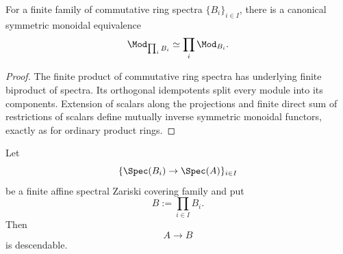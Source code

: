\begin{lemma}
\label{lem:spectral-modules-finite-products}
For a finite family of commutative ring spectra $\{B_i\}_{i\in I}$, there
is a canonical symmetric monoidal equivalence
\[
    \Mod_{\prod_iB_i}
    \simeq
    \prod_i\Mod_{B_i}.
\]
\end{lemma}

\begin{proof}
The finite product of commutative ring spectra has underlying finite
biproduct of spectra. Its orthogonal idempotents split every module into
its components. Extension of scalars along the projections and finite
direct sum of restrictions of scalars define mutually inverse symmetric
monoidal functors, exactly as for ordinary product rings.
\end{proof}

\begin{proposition}
\label{prop:finite-zariski-covers-descendable}
Let
\[
    \{\Spec(B_i)\to\Spec(A)\}_{i\in I}
\]
be a finite affine spectral Zariski covering family and put
\[
    B
    :=
    \prod_{i\in I}B_i.
\]
Then
\[
    A
    \longrightarrow
    B
\]
is descendable.
\end{proposition}

